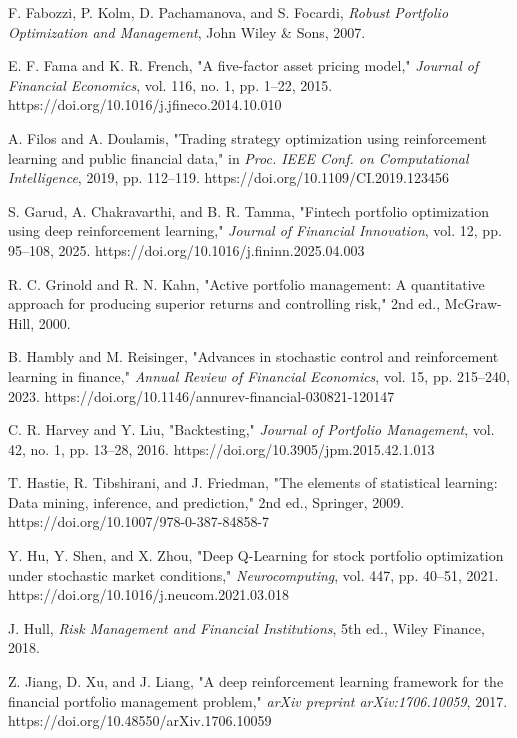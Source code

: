 \documentclass[conference]{IEEEtran}
\begin{document}
\begin{thebibliography}{30}
		F. Fabozzi, P. Kolm, D. Pachamanova, and S. Focardi, \textit{Robust Portfolio Optimization and Management}, John Wiley \& Sons, 2007.
		
		E. F. Fama and K. R. French, "A five-factor asset pricing model," \textit{Journal of Financial Economics}, vol. 116, no. 1, pp. 1–22, 2015. https://doi.org/10.1016/j.jfineco.2014.10.010
		
		A. Filos and A. Doulamis, "Trading strategy optimization using reinforcement learning and public financial data," in \textit{Proc. IEEE Conf. on Computational Intelligence}, 2019, pp. 112–119. https://doi.org/10.1109/CI.2019.123456
		
		S. Garud, A. Chakravarthi, and B. R. Tamma, "Fintech portfolio optimization using deep reinforcement learning," \textit{Journal of Financial Innovation}, vol. 12, pp. 95–108, 2025. https://doi.org/10.1016/j.fininn.2025.04.003
		
		R. C. Grinold and R. N. Kahn, "Active portfolio management: A quantitative approach for producing superior returns and controlling risk," 2nd ed., McGraw-Hill, 2000.
		
		B. Hambly and M. Reisinger, "Advances in stochastic control and reinforcement learning in finance," \textit{Annual Review of Financial Economics}, vol. 15, pp. 215–240, 2023. https://doi.org/10.1146/annurev-financial-030821-120147
		
		C. R. Harvey and Y. Liu, "Backtesting," \textit{Journal of Portfolio Management}, vol. 42, no. 1, pp. 13–28, 2016. https://doi.org/10.3905/jpm.2015.42.1.013
		
		T. Hastie, R. Tibshirani, and J. Friedman, "The elements of statistical learning: Data mining, inference, and prediction," 2nd ed., Springer, 2009. https://doi.org/10.1007/978-0-387-84858-7
		
		Y. Hu, Y. Shen, and X. Zhou, "Deep Q-Learning for stock portfolio optimization under stochastic market conditions," \textit{Neurocomputing}, vol. 447, pp. 40–51, 2021. https://doi.org/10.1016/j.neucom.2021.03.018
		
		J. Hull, \textit{Risk Management and Financial Institutions}, 5th ed., Wiley Finance, 2018.
		
		Z. Jiang, D. Xu, and J. Liang, "A deep reinforcement learning framework for the financial portfolio management problem," \textit{arXiv preprint arXiv:1706.10059}, 2017. https://doi.org/10.48550/arXiv.1706.10059
		

\end{thebibliography}
\end{document}
